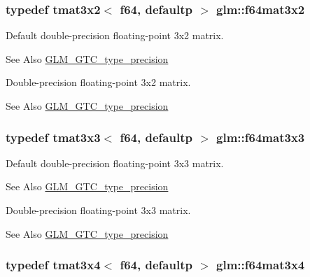\hypertarget{group__gtc__type__precision_ga0039ae03558b5242466f4c344c3c7d65}{
\subsubsection[{f64mat3x2}]{\setlength{\rightskip}{0pt plus 5cm}typedef tmat3x2$<$ f64, defaultp $>$ {\bf glm\-::f64mat3x2}}}\label{group__gtc__type__precision_ga0039ae03558b5242466f4c344c3c7d65}
Default double-\/precision floating-\/point 3x2 matrix. \begin{DoxySeeAlso}{See Also}
\hyperlink{group__gtc__type__precision}{G\-L\-M\-\_\-\-G\-T\-C\-\_\-type\-\_\-precision}
\end{DoxySeeAlso}
Double-\/precision floating-\/point 3x2 matrix. \begin{DoxySeeAlso}{See Also}
\hyperlink{group__gtc__type__precision}{G\-L\-M\-\_\-\-G\-T\-C\-\_\-type\-\_\-precision} 
\end{DoxySeeAlso}
\hypertarget{group__gtc__type__precision_gab272e67eb87cc1e8233237480c2aa8d2}{
\subsubsection[{f64mat3x3}]{\setlength{\rightskip}{0pt plus 5cm}typedef tmat3x3$<$ f64, defaultp $>$ {\bf glm\-::f64mat3x3}}}\label{group__gtc__type__precision_gab272e67eb87cc1e8233237480c2aa8d2}
Default double-\/precision floating-\/point 3x3 matrix. \begin{DoxySeeAlso}{See Also}
\hyperlink{group__gtc__type__precision}{G\-L\-M\-\_\-\-G\-T\-C\-\_\-type\-\_\-precision}
\end{DoxySeeAlso}
Double-\/precision floating-\/point 3x3 matrix. \begin{DoxySeeAlso}{See Also}
\hyperlink{group__gtc__type__precision}{G\-L\-M\-\_\-\-G\-T\-C\-\_\-type\-\_\-precision} 
\end{DoxySeeAlso}
\hypertarget{group__gtc__type__precision_ga36436dae85fc187d4a20d68c4d660a10}{
\subsubsection[{f64mat3x4}]{\setlength{\rightskip}{0pt plus 5cm}typedef tmat3x4$<$ f64, defaultp $>$ {\bf glm\-::f64mat3x4}}}\label{group__gtc__type__precision_ga36436dae85fc187d4a20d68c4d660a10}
